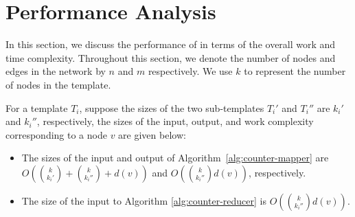 
\section{Performance Analysis}
\label{sec:performance-analysis}

In this section, we discuss the performance of \sahad{} in terms of the overall work
and time complexity.
Throughout this section, we denote the
number of nodes and edges in the network by $n$ and $m$ respectively. We use $k$
to represent the number of nodes in the template. 

\begin{lemma}
\label{lemma:counter}
For a template $T_i$, suppose the sizes of the two sub-templates $T_i'$ and
$T_i''$ are $k_i'$ and $k_i''$, respectively, the sizes of the input, output, and
work complexity corresponding to a node $v$ are given below:

\begin{itemize}

\item The sizes of the input and output of Algorithm~\ref{alg:counter-mapper}
 are $O({k \choose k_i'} + {k \choose k_i''} + d(v))$ and $O({k \choose
 k_i''}d(v))$, respectively.

\item The size of the input to Algorithm \ref{alg:counter-reducer} is $O({k \choose k_i''}d(v))$.

\end{itemize}

\end{lemma}

